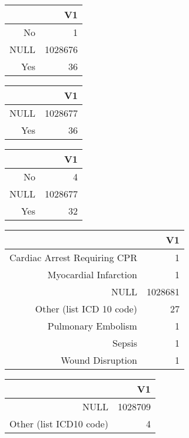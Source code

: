 \bigskip\bigskip
\centering
\begin{tabular}{rr}
  \hline
 & V1 \\ 
  \hline
No &   1 \\ 
  NULL & 1028676 \\ 
  Yes &  36 \\ 
   \hline
\end{tabular}

\bigskip\bigskip
\centering
\begin{tabular}{rr}
  \hline
 & V1 \\ 
  \hline
NULL & 1028677 \\ 
  Yes &  36 \\ 
   \hline
\end{tabular}

\bigskip\bigskip
\centering
\begin{tabular}{rr}
  \hline
 & V1 \\ 
  \hline
No &   4 \\ 
  NULL & 1028677 \\ 
  Yes &  32 \\ 
   \hline
\end{tabular}

\bigskip\bigskip
\centering
\begin{tabular}{rr}
  \hline
 & V1 \\ 
  \hline
Cardiac Arrest Requiring CPR &   1 \\ 
  Myocardial Infarction &   1 \\ 
  NULL & 1028681 \\ 
  Other (list ICD 10 code) &  27 \\ 
  Pulmonary Embolism &   1 \\ 
  Sepsis &   1 \\ 
  Wound Disruption &   1 \\ 
   \hline
\end{tabular}

\bigskip\bigskip
\centering
\begin{tabular}{rr}
  \hline
 & V1 \\ 
  \hline
NULL & 1028709 \\ 
  Other (list ICD10 code) &   4 \\ 
   \hline
\end{tabular}

